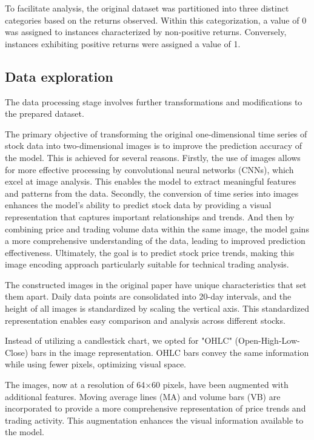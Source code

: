 \documentclass{article}
\begin{document}
To facilitate analysis, the original dataset was partitioned into three distinct categories based on the returns observed. Within this categorization, a value of 0 was assigned to instances characterized by non-positive returns. Conversely, instances exhibiting positive returns were assigned a value of 1.

\subsection{Data exploration}
The data processing stage involves further transformations and modifications to the prepared dataset. 

The primary objective of transforming the original one-dimensional time series of stock data into two-dimensional images is to improve the prediction accuracy of the model. This is achieved for several reasons. Firstly, the use of images allows for more effective processing by convolutional neural networks (CNNs), which excel at image analysis. This enables the model to extract meaningful features and patterns from the data. Secondly, the conversion of time series into images enhances the model's ability to predict stock data by providing a visual representation that captures important relationships and trends. And then by combining price and trading volume data within the same image, the model gains a more comprehensive understanding of the data, leading to improved prediction effectiveness. Ultimately, the goal is to predict stock price trends, making this image encoding approach particularly suitable for technical trading analysis.

The constructed images in the original paper have unique characteristics that set them apart. Daily data points are consolidated into 20-day intervals, and the height of all images is standardized by scaling the vertical axis. This standardized representation enables easy comparison and analysis across different stocks. 

Instead of utilizing a candlestick chart, we opted for "OHLC" (Open-High-Low-Close) bars in the image representation. OHLC bars convey the same information while using fewer pixels, optimizing visual space.

The images, now at a resolution of 64×60 pixels, have been augmented with additional features. Moving average lines (MA) and volume bars (VB) are incorporated to provide a more comprehensive representation of price trends and trading activity. This augmentation enhances the visual information available to the model.
\end{document}
